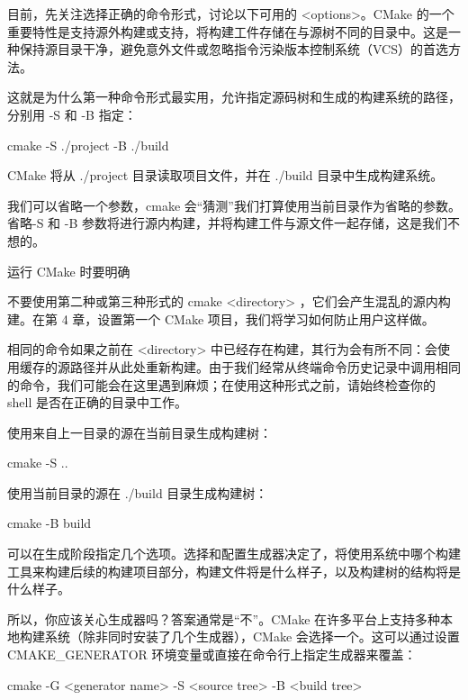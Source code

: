 目前，先关注选择正确的命令形式，讨论以下可用的 <options>。CMake 的一个重要特性是支持源外构建或支持，将构建工件存储在与源树不同的目录中。这是一种保持源目录干净，避免意外文件或忽略指令污染版本控制系统（VCS）的首选方法。

这就是为什么第一种命令形式最实用，允许指定源码树和生成的构建系统的路径，分别用 -S 和 -B 指定：

\begin{shell}
cmake -S ./project -B ./build
\end{shell}

CMake 将从 ./project 目录读取项目文件，并在 ./build 目录中生成构建系统。

我们可以省略一个参数，cmake 会“猜测”我们打算使用当前目录作为省略的参数。省略-S 和 -B 参数将进行源内构建，并将构建工件与源文件一起存储，这是我们不想的。

\begin{myNotic}{运行 CMake 时要明确}

不要使用第二种或第三种形式的 cmake <directory> ，它们会产生混乱的源内构建。在第 4 章，设置第一个 CMake 项目，我们将学习如何防止用户这样做。

相同的命令如果之前在 <directory> 中已经存在构建，其行为会有所不同：会使用缓存的源路径并从此处重新构建。由于我们经常从终端命令历史记录中调用相同的命令，我们可能会在这里遇到麻烦；在使用这种形式之前，请始终检查你的 shell 是否在正确的目录中工作。
\end{myNotic}


使用来自上一目录的源在当前目录生成构建树：

\begin{shell}
cmake -S ..
\end{shell}

使用当前目录的源在 ./build 目录生成构建树：

\begin{shell}
cmake -B build
\end{shell}


可以在生成阶段指定几个选项。选择和配置生成器决定了，将使用系统中哪个构建工具来构建后续的构建项目部分，构建文件将是什么样子，以及构建树的结构将是什么样子。

所以，你应该关心生成器吗？答案通常是“不”。CMake 在许多平台上支持多种本地构建系统（除非同时安装了几个生成器），CMake 会选择一个。这可以通过设置 CMAKE\_GENERATOR 环境变量或直接在命令行上指定生成器来覆盖：

\begin{shell}
cmake -G <generator name> -S <source tree> -B <build tree>
\end{shell}

